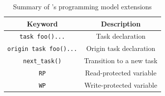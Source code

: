 \begin{table}
	\centering
	\footnotesize
	\begin{tabular}{|c|c|}
		\hline
		Keyword & Description\\
		\hline\hline
		\texttt{task foo(){...}} & Task declaration\\
		\texttt{origin task foo(){...}} & Origin task declaration\\
		\texttt{next\_task()} & Transition to a new task\\
		\texttt{RP} & Read-protected variable\\
		\texttt{WP} & Write-protected variable\\
		\hline
	\end{tabular}
\caption{Summary of \sys's programming model extensions}
\label{tab:viper_syntax}
\end{table}
